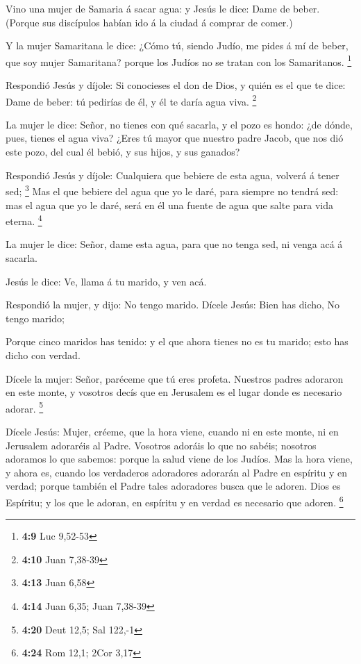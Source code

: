  Vino una mujer de Samaria á sacar agua: y Jesús le dice:
Dame de beber.  (Porque sus discípulos habían ido á la
ciudad á comprar de comer.)

 Y la mujer Samaritana le dice: ¿Cómo tú, siendo Judío, me
pides á mí de beber, que soy mujer Samaritana? porque los Judíos no se
tratan con los Samaritanos. \footnote{\textbf{4:9} Luc 9,52-53}

 Respondió Jesús y díjole: Si conocieses el don de Dios, y
quién es el que te dice: Dame de beber: tú pedirías de él, y él te daría
agua viva. \footnote{\textbf{4:10} Juan 7,38-39}

 La mujer le dice: Señor, no tienes con qué sacarla, y el
pozo es hondo: ¿de dónde, pues, tienes el agua viva?  ¿Eres
tú mayor que nuestro padre Jacob, que nos dió este pozo, del cual él
bebió, y sus hijos, y sus ganados?

 Respondió Jesús y díjole: Cualquiera que bebiere de esta
agua, volverá á tener sed; \footnote{\textbf{4:13} Juan 6,58}
 Mas el que bebiere del agua que yo le daré, para siempre
no tendrá sed: mas el agua que yo le daré, será en él una fuente de agua
que salte para vida eterna. \footnote{\textbf{4:14} Juan 6,35; Juan
  7,38-39}

 La mujer le dice: Señor, dame esta agua, para que no tenga
sed, ni venga acá á sacarla.

 Jesús le dice: Ve, llama á tu marido, y ven acá.

 Respondió la mujer, y dijo: No tengo marido. Dícele Jesús:
Bien has dicho, No tengo marido;

 Porque cinco maridos has tenido: y el que ahora tienes no
es tu marido; esto has dicho con verdad.

 Dícele la mujer: Señor, paréceme que tú eres profeta.
 Nuestros padres adoraron en este monte, y vosotros decís
que en Jerusalem es el lugar donde es necesario adorar. \footnote{\textbf{4:20}
  Deut 12,5; Sal 122,-1}

 Dícele Jesús: Mujer, créeme, que la hora viene, cuando ni
en este monte, ni en Jerusalem adoraréis al Padre. 
Vosotros adoráis lo que no sabéis; nosotros adoramos lo que sabemos:
porque la salud viene de los Judíos.  Mas la hora viene, y
ahora es, cuando los verdaderos adoradores adorarán al Padre en espíritu
y en verdad; porque también el Padre tales adoradores busca que le
adoren.  Dios es Espíritu; y los que le adoran, en espíritu
y en verdad es necesario que adoren. \footnote{\textbf{4:24} Rom 12,1;
  2Cor 3,17}

